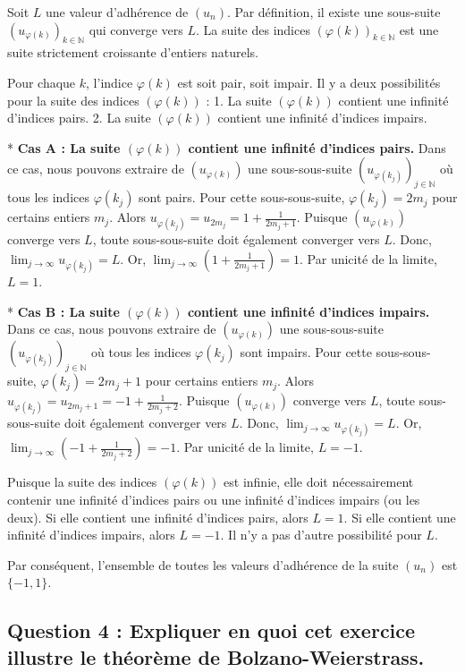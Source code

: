 \documentclass{report}
\begin{document}
Soit $L$ une valeur d'adhérence de $(u_n)$. Par définition, il existe une sous-suite $(u_{\varphi(k)})_{k \in \mathbb{N}}$ qui converge vers $L$.
La suite des indices $(\varphi(k))_{k \in \mathbb{N}}$ est une suite strictement croissante d'entiers naturels.

Pour chaque $k$, l'indice $\varphi(k)$ est soit pair, soit impair.
Il y a deux possibilités pour la suite des indices $(\varphi(k))$ :
1.  La suite $(\varphi(k))$ contient une infinité d'indices pairs.
2.  La suite $(\varphi(k))$ contient une infinité d'indices impairs.

*   \textbf{Cas A : La suite $(\varphi(k))$ contient une infinité d'indices pairs.}
    Dans ce cas, nous pouvons extraire de $(u_{\varphi(k)})$ une sous-sous-suite $(u_{\varphi(k_j)})_{j \in \mathbb{N}}$ où tous les indices $\varphi(k_j)$ sont pairs.
    Pour cette sous-sous-suite, $\varphi(k_j) = 2m_j$ pour certains entiers $m_j$.
    Alors $u_{\varphi(k_j)} = u_{2m_j} = 1 + \frac{1}{2m_j+1}$.
    Puisque $(u_{\varphi(k)})$ converge vers $L$, toute sous-sous-suite doit également converger vers $L$.
    Donc, $\lim_{j \to \infty} u_{\varphi(k_j)} = L$.
    Or, $\lim_{j \to \infty} \left(1 + \frac{1}{2m_j+1}\right) = 1$.
    Par unicité de la limite, $L=1$.

*   \textbf{Cas B : La suite $(\varphi(k))$ contient une infinité d'indices impairs.}
    Dans ce cas, nous pouvons extraire de $(u_{\varphi(k)})$ une sous-sous-suite $(u_{\varphi(k_j)})_{j \in \mathbb{N}}$ où tous les indices $\varphi(k_j)$ sont impairs.
    Pour cette sous-sous-suite, $\varphi(k_j) = 2m_j+1$ pour certains entiers $m_j$.
    Alors $u_{\varphi(k_j)} = u_{2m_j+1} = -1 + \frac{1}{2m_j+2}$.
    Puisque $(u_{\varphi(k)})$ converge vers $L$, toute sous-sous-suite doit également converger vers $L$.
    Donc, $\lim_{j \to \infty} u_{\varphi(k_j)} = L$.
    Or, $\lim_{j \to \infty} \left(-1 + \frac{1}{2m_j+2}\right) = -1$.
    Par unicité de la limite, $L=-1$.

Puisque la suite des indices $(\varphi(k))$ est infinie, elle doit nécessairement contenir une infinité d'indices pairs ou une infinité d'indices impairs (ou les deux).
Si elle contient une infinité d'indices pairs, alors $L=1$.
Si elle contient une infinité d'indices impairs, alors $L=-1$.
Il n'y a pas d'autre possibilité pour $L$.

Par conséquent, l'ensemble de toutes les valeurs d'adhérence de la suite $(u_n)$ est $\{-1, 1\}$.

\subsection*{Question 4 : Expliquer en quoi cet exercice illustre le théorème de Bolzano-Weierstrass.}
\end{document}
